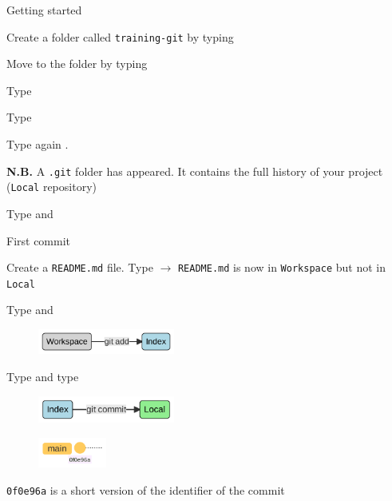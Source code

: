 \documentclass[10pt]{beamer}
\begin{document}
\begin{frame}[fragile]{Getting started}
\protect\hypertarget{getting-started}{}

Create a folder called \texttt{training-git} by typing

Move to the folder by typing 

Type 

Type 

Type again .

\textbf{N.B.} A \texttt{.git} folder has appeared. It contains the full history of
your project (\texttt{Local} repository)

Type  and 
\end{frame}

\begin{frame}[fragile]{First commit}
\protect\hypertarget{first-commit}{}

Create a \texttt{README.md} file. Type 
\(\rightarrow\) \texttt{README.md} is now in \texttt{Workspace} but
not in \texttt{Local}

Type  and 

\begin{figure}[H]

{\centering \includegraphics[width=0.4\textwidth]{mermaid/mermaid-figure-26.png}

}

\end{figure}

Type  and type

\begin{figure}[H]

{\centering \includegraphics[width=0.4\textwidth]{mermaid/mermaid-figure-25.png}

}

\end{figure}

\begin{figure}[H]

{\centering \includegraphics[width=0.2\textwidth]{mermaid/mermaid-figure-24.png}}

\end{figure}


\texttt{0f0e96a} is a short version of the identifier of the commit

\end{frame}
\end{document}
